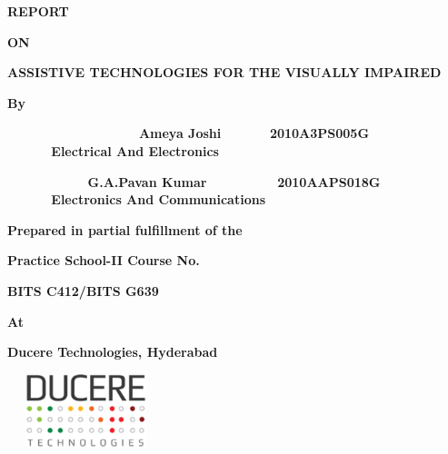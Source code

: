 {\centering{}\bfseries
REPORT
\par}

{\centering{}\bfseries
ON
\par}

{\centering{}\bfseries
ASSISTIVE TECHNOLOGIES FOR THE VISUALLY IMPAIRED
\par}

\bigskip


\bigskip


\bigskip


\bigskip

{\centering{}\bfseries
By
\par}


\bigskip

{\bfseries
\ \ \ \ \ \ \ \ \ \ \ \ \ \ \ \ \ \ Ameya Joshi \ \ \ \ \ \ 2010A3PS005G
\ \ \ \ \ \ Electrical And Electronics\ \  }

{\bfseries
\ \ \ \ \ \ \ \ \ \ \  G.A.Pavan Kumar \ \ \ \ \ \ \ \ \ 2010AAPS018G
\ \ \ \ \ \ Electronics And Communications\ \  }
\bigskip

{\centering{}\bfseries
Prepared in partial fulfillment of the
\par}

{\centering{}\bfseries
Practice School-II Course No.
\par}

{\centering{}\bfseries
BITS C412/BITS G639
\par}


\bigskip

{\centering{}\bfseries
At
\par}


\bigskip

{\centering{}\bfseries
Ducere Technologies, Hyderabad
\par}

{\centering 
\includegraphics[width=4.575cm,height=2.124cm]{logo.png}
\par}


\bigskip


\bigskip

